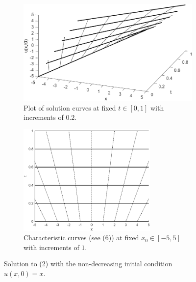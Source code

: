 \documentclass{myproject}
\begin{document}
\begin{figure}
    \centering
    \begin{subfigure}{.48\textwidth}
        \centering
        \includegraphics[width=1.0\textwidth]{intro_f1_3d.png}
        \caption{Plot of solution curves at fixed $t\in[0,1]$ with increments of $0.2$.}
        \label{fig:f1_3d}
    \end{subfigure}\hfill
    \begin{subfigure}{.48\textwidth}
        \centering
        \includegraphics[width=0.75\textwidth]{intro_f1_char.png}
        \caption{Characteristic curves (see (6)) at fixed $x_0 \in [-5, 5]$ with increments of $1$.}
        \label{fig:f1_char}
    \end{subfigure}
    \caption{Solution to (2) with the non-decreasing initial condition $u(x,0) = x$.}
    \label{fig:f1}
\end{figure}
\end{document}
